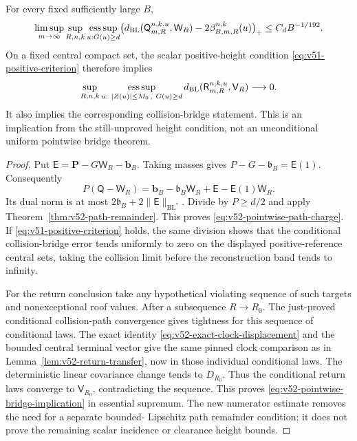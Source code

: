 \begin{proposition}
\label{prop:v52-pointwise-path-charge}
For every fixed sufficiently large $B$,
\begin{equation}\label{eq:v52-pointwise-path-charge}
 \limsup_{m\to\infty}\sup_{R,n,k}
 \operatorname*{ess\,sup}_{u:G(u)\ge d}
 \bigl(d_{\rm BL}(\mathsf Q_{m,R}^{n,k,u},\mathsf W_R)
                       -2\beta_{B,m,R}^{n,k}(u)\bigr)_+
                                              \le C_dB^{-1/192}.
\end{equation}
On a fixed central compact set, the scalar positive-height condition
\eqref{eq:v51-positive-criterion} therefore implies
\begin{equation}\label{eq:v52-pointwise-bridge-implication}
 \sup_{R,n,k}\operatorname*{ess\,sup}_{\substack{u:\ |Z(u)|\le M_0\,,\ G(u)\ge d}}
 d_{\rm BL}(\mathsf R_{m,R}^{n,k,u},\mathsf V_R)\longrightarrow0.
\end{equation}
It also implies the corresponding collision-bridge statement. This
is an implication from the still-unproved height condition, not an
unconditional uniform pointwise bridge theorem.
\end{proposition}
\begin{proof}
Put $\mathsf E=\mathbf P-G\mathsf W_R-\mathbf b_B$.
Taking masses gives $P-G-\mathfrak b_B=\mathsf E(1)$.
Consequently
\[
 P(\mathsf Q-\mathsf W_R)
     =\mathbf b_B-\mathfrak b_B\mathsf W_R
                         +\mathsf E-\mathsf E(1)\mathsf W_R.
\]
Its dual norm is at most $2\mathfrak b_B+2\|\mathsf E\|_{\mathrm{BL}^*}$.
Divide by $P\ge d/2$ and apply
Theorem~\ref{thm:v52-path-remainder}. This proves
\eqref{eq:v52-pointwise-path-charge}.
If \eqref{eq:v51-positive-criterion} holds, the same division shows
that the conditional collision-bridge error tends uniformly to zero
on the displayed positive-reference central sets, taking the collision
limit before the reconstruction band tends to infinity.

For the return conclusion take any hypothetical violating sequence
of such targets and nonexceptional roof values. After a subsequence
$R\to R_0$. The just-proved conditional collision-path convergence
gives tightness for this sequence of conditional laws. The exact
identity \eqref{eq:v52-exact-clock-displacement} and the bounded
central terminal vector give the same pinned clock comparison as in
Lemma~\ref{lem:v52-return-transfer}, now in those individual
conditional laws. The deterministic linear covariance change tends
to $D_{R_0}$. Thus the conditional return laws converge to
$\mathsf V_{R_0}$, contradicting the sequence. This proves
\eqref{eq:v52-pointwise-bridge-implication} in essential supremum.
The new numerator estimate removes the need for a separate bounded-
Lipschitz path remainder condition; it does not prove the remaining
scalar incidence or clearance height bounds.
\end{proof}

